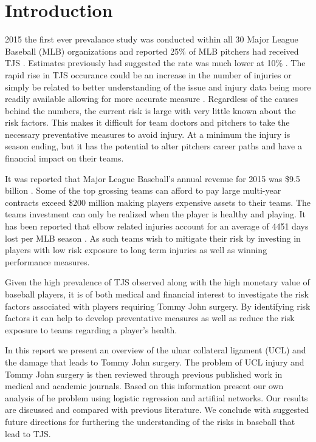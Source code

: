 \section {Introduction}
 2015 the first ever prevalance study was conducted within all 30 Major League Baseball (MLB) organizations and reported 25\% of MLB pitchers had received TJS \cite{Conte2015}. Estimates previously had suggested the rate was much lower at 10\% \cite{Erickson2014}. The rapid rise in TJS occurance could be an increase in the number of injuries or simply be related to better understanding of the issue and injury data being more readily available allowing for more accurate measure \cite{Safran2005}. Regardless of the causes behind the numbers, the current risk is large with very little known about the risk factors. This makes it difficult for team doctors and pitchers to take the necessary preventative measures to avoid injury. At a minimum the injury is season ending, but it has the potential to alter pitchers career paths and have a financial impact on their teams.

It was reported that Major League Baseball's annual revenue for 2015 was \$9.5 billion \cite{ForbesMLB}. Some of the top grossing teams can afford to pay large multi-year contracts exceed \$200 million making players expensive assets to their teams. The teams investment can only be realized when the player is healthy and playing. It has been reported that elbow related injuries account for an average of 4451 days lost per MLB season \cite{Conte2015}. As such teams wish to mitigate their risk by investing in players with low risk exposure to long term injuries as well as winning performance measures.

Given the high prevalence of TJS observed along with the high monetary value of baseball players, it is of both medical and financial interest to investigate the risk factors associated with players requiring Tommy John surgery. By identifying risk factors it can help to develop preventative measures as well as reduce the risk exposure to teams regarding a player's health.

In this report we present an overview of the ulnar collateral ligament (UCL) and the damage that leads to Tommy John surgery. The problem of UCL injury and Tommy John surgery is then reviewed through previous published work in medical and academic journals. Based on this information present our own analysis of he problem using logistic regression and artifiial networks. Our results are discussed and compared with previous literature. We conclude with suggested future directions for furthering the understanding of the risks in baseball that lead to TJS.